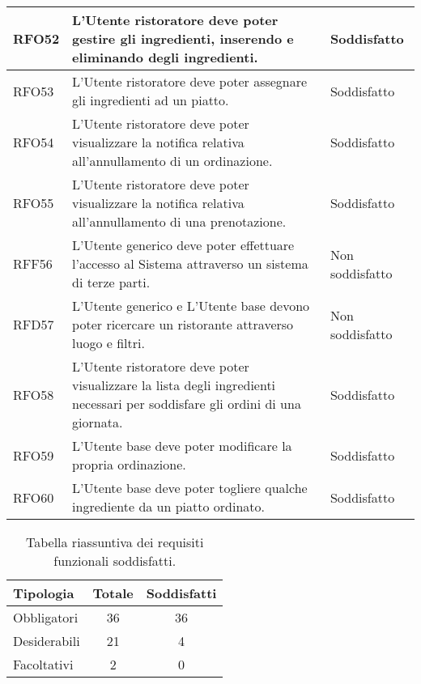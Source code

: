 \begin{longtable}{|l|p{}|p{3cm}|}
	\hline
	RFO52       & L'Utente ristoratore deve poter gestire gli ingredienti, inserendo e eliminando degli ingredienti.                    & Soddisfatto \\
	\hline
	RFO53       & L'Utente ristoratore deve poter assegnare gli ingredienti ad un piatto.                                               & Soddisfatto \\
	\hline
	RFO54       & L'Utente ristoratore deve poter visualizzare la notifica relativa all'annullamento di un ordinazione.                 & Soddisfatto \\
	\hline
	RFO55       & L'Utente ristoratore deve poter visualizzare la notifica relativa all'annullamento di una prenotazione.               & Soddisfatto \\
	\hline
	RFF56       & L'Utente generico deve poter effettuare l'accesso al Sistema attraverso un sistema di terze parti.                 	& Non soddisfatto \\
	\hline
	RFD57	   & L'Utente generico e L'Utente base devono poter ricercare un ristorante attraverso luogo e filtri.  					& Non soddisfatto \\
	\hline
	RFO58	   & L'Utente ristoratore deve poter visualizzare la lista degli ingredienti necessari per soddisfare gli ordini di una giornata. & Soddisfatto \\ 
	\hline
	RFO59	   & L'Utente base deve poter modificare la propria ordinazione.  															& Soddisfatto \\
	\hline
	RFO60	   & L'Utente base deve poter togliere qualche ingrediente da un piatto ordinato. 										    & Soddisfatto \\	
	\hline
\end{longtable}

\begin{table}[H]
	\centering
	\begin{tabular}{l|c|c}
		\textbf{Tipologia} & \textbf{Totale} & \textbf{Soddisfatti} \\
		\hline
		Obbligatori       & 36              & 36                   \\
		Desiderabili      & 21              & 4                    \\
		Facoltativi       & 2               & 0                    \\
	\end{tabular}
	\caption{Tabella riassuntiva dei requisiti funzionali soddisfatti.}
\end{table}
